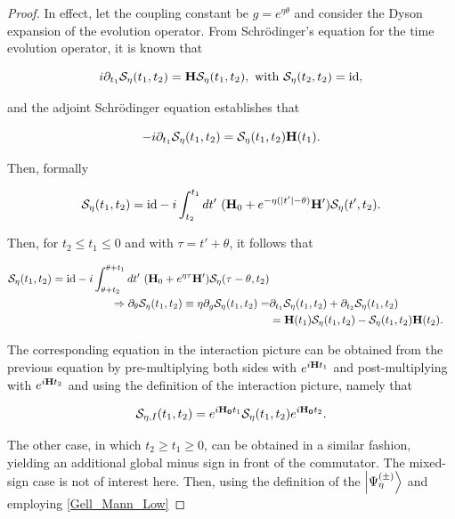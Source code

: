 \documentclass{homework}
\begin{document}
\begin{proof}

In effect, let the coupling constant be $g = e^{\eta \theta}$ and consider the Dyson expansion of the evolution operator. From Schr\"odinger's equation for the time evolution operator, it is known that 

$$
    i \partial_{t_1} \mathcal{S}_{\eta}(t_1,t_2) = {\bf H} \mathcal{S}_{\eta}(t_1,t_2), \textnormal{ with } \mathcal{S}_{\eta}(t_2,t_2) = \textnormal{id}, 
$$

and the adjoint Schr\"odinger equation establishes that 

$$
-i \partial_{t_1} \mathcal{S}_{\eta}(t_1,t_2) = \mathcal{S}_{\eta}(t_1,t_2) {\bf H}(t_1). 
$$

Then, formally 

$$
    \mathcal{S}_{\eta}(t_1,t_2) = \textnormal{id} - i \int_{t_2}^{t_1}dt' \textnormal{ } ({\bf H}_0 + e^{-\eta (|t'| - \theta)} {\bf H}') \mathcal{S}_{\eta}(t',t_2).
$$


Then, for $t_2 \leq t_1 \leq 0$ and with $\tau = t' + \theta$, it follows that 

\begin{equation}
    \begin{split}
        \mathcal{S}_{\eta}(t_1,t_2) = \textnormal{id} - i \int_{\theta + t_2}^{\theta + t_1}dt' \textnormal{ } ({\bf H}_0 + e^{\eta \tau} {\bf H}') \mathcal{S}_{\eta}(\tau - \theta,t_2) \\
        \Rightarrow \partial_{\theta} \mathcal{S}_{\eta}(t_1,t_2) \equiv \eta \partial_{g} \mathcal{S}_{\eta}(t_1,t_2) =& \partial_{t_1} \mathcal{S}_{\eta}(t_1,t_2) + \partial_{t_2}\mathcal{S}_{\eta}(t_1,t_2) \\
        &= {\bf H}(t_1) \mathcal{S}_{\eta}(t_1,t_2) - \mathcal{S}_{\eta}(t_1,t_2) {\bf H}(t_2).
    \end{split}
    \label{Gell_Mann_Low}
\end{equation}

The corresponding equation in the interaction picture can be obtained from the previous equation by pre-multiplying both sides with $e^{i {\bf H} t_1}$ and post-multiplying with $e^{i {\bf H} t_2}$ and using the definition of the interaction picture, namely that 

$$
    \mathcal{S}_{\eta, I}(t_1,t_2) = e^{i {\bf H_0} t_1} \mathcal{S}_{\eta}(t_1,t_2) e^{i {\bf H_0} t_2}. 
$$

The other case, in which $t_2 \geq t_1 \geq 0$, can be obtained in a similar fashion, yielding an additional global minus sign in front of the commutator. The mixed-sign case is not of interest here. Then, using the definition of the $\ket{\Psi_{\eta}^{(\pm)}}$ and employing \cref{Gell_Mann_Low}


\end{proof}
\end{document}
